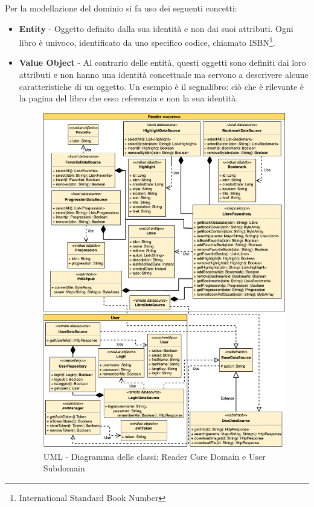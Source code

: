 Per la modellazione del dominio si fa uso dei seguenti concetti\cite{evans_domain-driven_2004}:
\begin{itemize}
    \item \textbf{Entity} - Oggetto definito dalla sua identità e non dai suoi attributi. Ogni libro è univoco, identificato da uno specifico codice, chiamato ISBN\footnote{International Standard Book Number}.
    \item \textbf{Value Object} - Al contrario delle entità, questi oggetti sono definiti dai loro attributi e non hanno una identità concettuale ma servono a descrivere alcune caratteristiche di un oggetto. Un esempio è il segnalibro: ciò che è rilevante è la pagina del libro che esso referenzia e non la sua identità.

    \begin{figure}[H]
        \centering
        \includegraphics[width=1\textwidth]{img/class-uml-app.png}
        \caption{UML - Diagramma delle classi: Reader Core Domain e User Subdomain}
        \label{class-uml-app}
    \end{figure}
    

\end{itemize}
